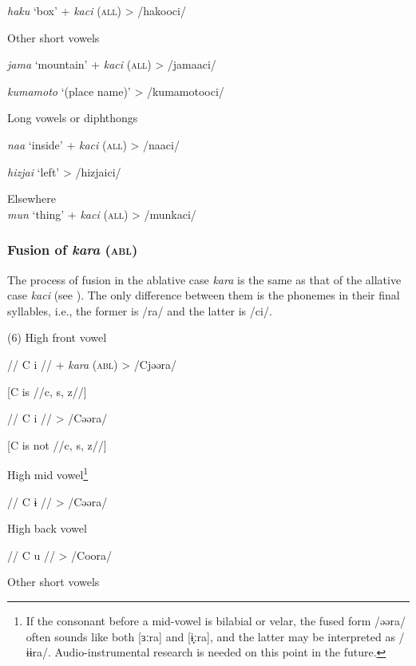     \textit{haku}  ‘box’  +  \textit{kaci} (\textsc{all})  >  /hakooci/

 \ex Other short vowels\\
\gll

    \textit{jama}  ‘mountain’  +  \textit{kaci} (\textsc{all})  >  /jamaaci/

    \textit{kumamoto}  ‘(place name)’      >  /kumamotooci/  

 \ex Long vowels or diphthongs  \\
\gll

    \textit{naa}  ‘inside’  +  \textit{kaci} (\textsc{all})  >  /naaci/

    \textit{hizjai}  ‘left’      >  /hizjaici/  

\ex  Elsewhere\\

    \textit{mun}  ‘thing’  +  \textit{kaci} (\textsc{all})  >  /munkaci/

\subsubsection{Fusion of \textit{kara} (\textsc{abl})}
\label{bkm:Ref365151812}
The process of fusion in the ablative case \textit{kara} is the same as that of the allative case \textit{kaci} (see ). The only difference between them is the phonemes in their final syllables, i.e., the former is /ra/ and the latter is /ci/.

(6) \ea High front vowel\\
\gll

    //  C  i  //  +  \textit{kara} (\textsc{abl})  >  /Cjəəra/

    [C is //c, s, z//]

    //  C  i  //      >  /Cəəra/

    [C is not //c, s, z//]

 \ex High mid vowel\footnote{If the consonant before a mid-vowel is bilabial or velar, the fused form /əəra/ often sounds like both [ɜːra] and [ɨ̞ːra], and the latter may be interpreted as /ɨɨra/. Audio-instrumental research is needed on this point in the future.}\\
\gll

    //  C  ɨ  //      >  /Cəəra/

 \ex High back vowel\\
\gll

    //  C  u  //      >  /Coora/

 \ex Other short vowels\\
\gll

